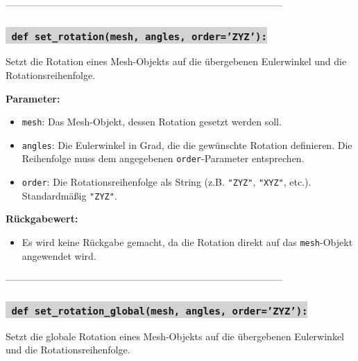 --------------------------------------------------------------------------------------



\subsubsection*{\colorbox{lightgray}{\texttt{\textbf{\color{green} def} \color{blue} set\_rotation}\textbf{\texttt{(mesh, angles, order='ZYZ'):}}}}
Setzt die Rotation eines Mesh-Objekts auf die übergebenen Eulerwinkel und die Rotationsreihenfolge.

\noindent \textbf{Parameter:} \vspace{-6ex} \\
\begin{itemize}
    \setlength{\itemindent}{1em}
    \item \texttt{mesh}: Das Mesh-Objekt, dessen Rotation gesetzt werden soll.
    \item \texttt{angles}: Die Eulerwinkel in Grad, die die gewünschte Rotation definieren. Die Reihenfolge muss dem angegebenen \texttt{order}-Parameter entsprechen.
    \item \texttt{order}: Die Rotationsreihenfolge als String (z.B. \texttt{"ZYZ"}, \texttt{"XYZ"}, etc.). Standardmäßig \texttt{"ZYZ"}.
\end{itemize}

\noindent \textbf{Rückgabewert:} \vspace{-6ex} \\
\begin{itemize}
    \setlength{\itemindent}{1em}
    \item Es wird keine Rückgabe gemacht, da die Rotation direkt auf das \texttt{mesh}-Objekt angewendet wird.
\end{itemize}

--------------------------------------------------------------------------------------



\subsubsection*{\colorbox{lightgray}{\texttt{\textbf{\color{green} def} \color{blue} set\_rotation\_global}\textbf{\texttt{(mesh, angles, order='ZYZ'):}}}}
Setzt die globale Rotation eines Mesh-Objekts auf die übergebenen Eulerwinkel und die Rotationsreihenfolge.

